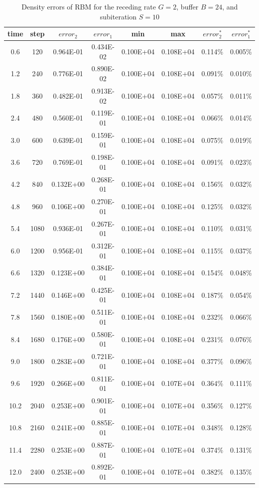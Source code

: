 \cp


\begin{table}[hbtp]%
\vspace{0.6in}
\begin{center}
\caption{Density errors of RBM for the receding rate $G=2$, buffer $B=24$, and subiteration $S=10$} %
\small
 \begin{tabular}{cccccccc} \hline %
 time & step & $error_{2}$ & $error_{1}$ &  min & max &  $error_{2}^*$ & $error_{1}^*$ \\ \hline
  0.6 &   120 & 0.964E-01 & 0.434E-02 & 0.100E+04 & 0.108E+04 &   0.114\% &   0.005\%  \\
  1.2 &   240 & 0.776E-01 & 0.890E-02 & 0.100E+04 & 0.108E+04 &   0.091\% &   0.010\%  \\
  1.8 &   360 & 0.482E-01 & 0.913E-02 & 0.100E+04 & 0.108E+04 &   0.057\% &   0.011\%  \\
  2.4 &   480 & 0.560E-01 & 0.119E-01 & 0.100E+04 & 0.108E+04 &   0.066\% &   0.014\%  \\
  3.0 &   600 & 0.639E-01 & 0.159E-01 & 0.100E+04 & 0.108E+04 &   0.075\% &   0.019\%  \\
  3.6 &   720 & 0.769E-01 & 0.198E-01 & 0.100E+04 & 0.108E+04 &   0.091\% &   0.023\%  \\
  4.2 &   840 & 0.132E+00 & 0.268E-01 & 0.100E+04 & 0.108E+04 &   0.156\% &   0.032\%  \\
  4.8 &   960 & 0.106E+00 & 0.270E-01 & 0.100E+04 & 0.108E+04 &   0.125\% &   0.032\%  \\
  5.4 &  1080 & 0.936E-01 & 0.267E-01 & 0.100E+04 & 0.108E+04 &   0.110\% &   0.031\%  \\
  6.0 &  1200 & 0.956E-01 & 0.312E-01 & 0.100E+04 & 0.108E+04 &   0.115\% &   0.037\%  \\
  6.6 &  1320 & 0.123E+00 & 0.384E-01 & 0.100E+04 & 0.108E+04 &   0.154\% &   0.048\%  \\
  7.2 &  1440 & 0.146E+00 & 0.425E-01 & 0.100E+04 & 0.108E+04 &   0.187\% &   0.054\%  \\
  7.8 &  1560 & 0.180E+00 & 0.511E-01 & 0.100E+04 & 0.108E+04 &   0.232\% &   0.066\%  \\
  8.4 &  1680 & 0.176E+00 & 0.580E-01 & 0.100E+04 & 0.108E+04 &   0.231\% &   0.076\%  \\
  9.0 &  1800 & 0.283E+00 & 0.721E-01 & 0.100E+04 & 0.108E+04 &   0.377\% &   0.096\%  \\
  9.6 &  1920 & 0.266E+00 & 0.811E-01 & 0.100E+04 & 0.107E+04 &   0.364\% &   0.111\%  \\
 10.2 &  2040 & 0.253E+00 & 0.901E-01 & 0.100E+04 & 0.107E+04 &   0.356\% &   0.127\%  \\
 10.8 &  2160 & 0.241E+00 & 0.885E-01 & 0.100E+04 & 0.107E+04 &   0.348\% &   0.128\%  \\
 11.4 &  2280 & 0.253E+00 & 0.887E-01 & 0.100E+04 & 0.107E+04 &   0.374\% &   0.131\%  \\
 12.0 &  2400 & 0.253E+00 & 0.892E-01 & 0.100E+04 & 0.107E+04 &   0.382\% &   0.135\%  \\
 \hline
 \end{tabular}
 \label{tab:1}
 \end{center}
 \end{table}

